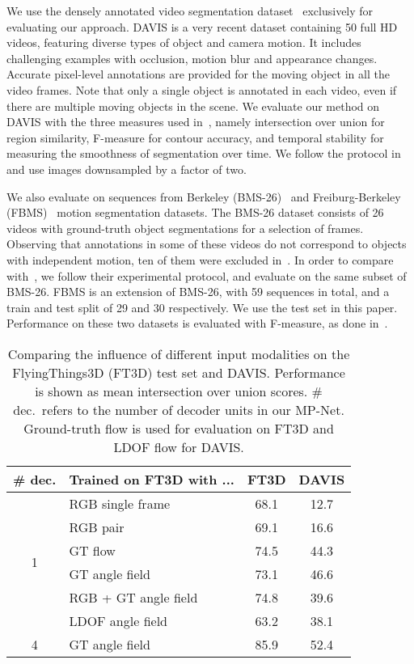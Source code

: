 \documentclass[10pt,twocolumn,letterpaper]{article}
\begin{document}
 We use the densely annotated video segmentation
dataset~\cite{Perazzi16} exclusively for evaluating our approach. DAVIS is a
very recent dataset containing 50 full HD videos, featuring diverse types of
object and camera motion. It includes challenging examples with occlusion,
motion blur and appearance changes. Accurate pixel-level annotations are
provided for the moving object in all the video frames. Note that only a single
object is annotated in each video, even if there are multiple moving objects in
the scene. We evaluate our method on DAVIS with the three measures used
in~\cite{Perazzi16}, namely intersection over union for region similarity,
F-measure for contour accuracy, and temporal stability for measuring the
smoothness of segmentation over time. We follow the protocol
in~\cite{Perazzi16} and use images downsampled by a factor of two.

 We also evaluate on sequences from Berkeley
(BMS-26)~\cite{brox2010object,Tron07} and Freiburg-Berkeley
(FBMS)~\cite{ochs2014segmentation} motion segmentation datasets. The BMS-26
dataset consists of 26 videos with ground-truth object segmentations for a
selection of frames. Observing that annotations in some of these videos do not
correspond to objects with independent motion, ten of them were excluded
in~\cite{Bideau16}. In order to compare with~\cite{Bideau16}, we follow their
experimental protocol, and evaluate on the same subset of BMS-26. FBMS is an
extension of BMS-26, with 59 sequences in total, and a train and test split of
29 and 30 respectively. We use the test set in this paper. Performance on these
two datasets is evaluated with F-measure, as done
in~\cite{Bideau16,taylor2015causal}.

\begin{table}
\begin{center}
\begin{tabular}{c|l|c|c}
\hline
\# dec. & Trained on FT3D with ... & FT3D & DAVIS \\
\hline
\multirow{6}{*}{1} & RGB single frame  & 68.1 & 12.7  \\
 & RGB pair  & 69.1 & 16.6  \\
 & GT flow  & 74.5 & 44.3  \\
 & GT angle field  & 73.1 & 46.6  \\
 & RGB + GT angle field  & 74.8 & 39.6  \\
 & LDOF angle field  & 63.2 & 38.1  \\
\hline
4 & GT angle field  & 85.9 & 52.4  \\
\hline
\end{tabular}
\vspace{0.1cm}
\caption{Comparing the influence of different input modalities on the
FlyingThings3D (FT3D) test set and DAVIS. Performance is shown as mean
intersection over union scores. \# dec.\ refers to the number of decoder units
in our MP-Net. Ground-truth flow is used for evaluation on FT3D and LDOF flow
for DAVIS.}
\label{tbl:input}
\vspace{-0.85cm}
\end{center}
\end{table}
\end{document}
